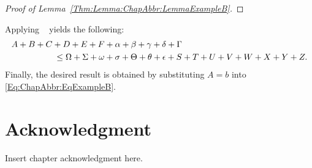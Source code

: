 
\begin{proof}
[Proof of Lemma~\ref{Thm:Lemma:ChapAbbr:LemmaExampleB}]
\lipsum[19-20]
\end{proof}


\lipsum[21]
Applying \Lemma~ yields the following:
\begin{align}
& A + B + C + D + E + F
+ \alpha + \beta + \gamma + \delta + \Gamma
\notag
\\
&\hspace{5em}
\leq
\Omega + \Sigma + \omega + \sigma + \Theta + \theta + \epsilon
+ S + T + U + V + W + X + Y + Z.
\label{Eq:ChapAbbr:EqExampleB}
\end{align}
Finally, the desired result is obtained by substituting \mbox{$A=b$} into \eqref{Eq:ChapAbbr:EqExampleB}.
\qedmarker


\EnableTOCUpdates


\section{Acknowledgment}
\label{Section:ChapAbbr:Acknowledgment}

Insert chapter acknowledgment here.
\lipsum[22]
